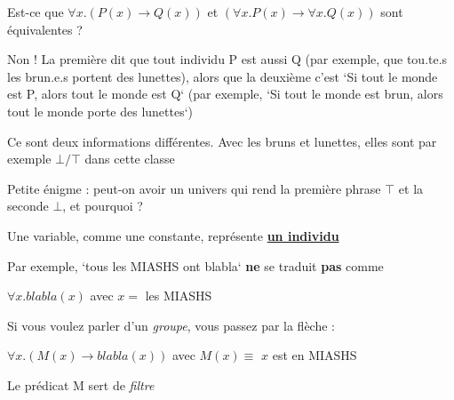 \begin{frame}

Est-ce que $\forall x. (P(x) \rightarrow Q(x))$ et $(\forall x. P(x) \rightarrow \forall x. Q(x))$ sont équivalentes ?\pause\newline

Non ! La première dit que tout individu P est aussi Q (par exemple, que tou.te.s les brun.e.s portent des lunettes), \pause alors que la deuxième c'est `Si tout le monde est P, alors tout le monde est Q` (par exemple, `Si tout le monde est brun, alors tout le monde porte des lunettes`)\pause\newline

Ce sont deux informations différentes. Avec les bruns et lunettes, elles sont par exemple $\bot/\top$ dans cette classe\pause\newline

Petite énigme : peut-on avoir un univers qui rend la première phrase $\top$ et la seconde $\bot$, et pourquoi ?

\end{frame}
	
	

\begin{frame}

Une variable, comme une constante, représente \textbf{\underline{un individu}}\pause\newline

Par exemple, `tous les MIASHS ont blabla` \textbf{ne} se traduit \textbf{pas} comme\newline

$\forall x. blabla(x)$ avec $x =$ les MIASHS\pause\newline

Si vous voulez parler d'un \textit{groupe}, vous passez par la flèche :\newline

$\forall x. (M(x) \rightarrow blabla(x))$ avec $M(x) \equiv$ $x$ est en MIASHS\pause\newline

Le prédicat M sert de \textit{filtre}

\end{frame}
	

